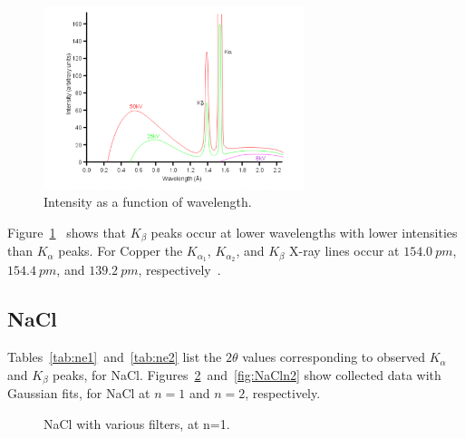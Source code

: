 \documentclass[aps,prl,twocolumn,superscriptaddress]{revtex4-1}
\begin{document}
\begin{figure}[H]
	\begin{center}
		\centerline{\includegraphics[width=3in]{figures/intensity}}
		\caption{\small{Intensity as a function of wavelength. \label{fig:intensity}}}
	\end{center}
\end{figure}

Figure~\ref{fig:intensity}~\cite{daichi} shows that $K_{\beta}$ peaks occur at lower wavelengths with lower intensities than $K_{\alpha}$ peaks.  For Copper the $K_{\alpha_{1}}$, $K_{\alpha_{2}}$, and $K_{\beta}$ X-ray lines occur at $154.0~pm$, $154.4~pm$, and $139.2~pm$, respectively~\cite{she}.


\subsection{NaCl}

Tables~\ref{tab:ne1}~and~\ref{tab:ne2} list the $2\theta$ values corresponding to observed $K_{\alpha}$ and $K_{\beta}$ peaks, for NaCl.  Figures~\ref{fig:NaCln1}~and~\ref{fig:NaCln2} show collected data with Gaussian fits, for NaCl at $n=1$ and $n=2$, respectively.

\begin{figure}[H]
	\begin{center}
		\centerline{}
		\caption{\small{NaCl with various filters, at n=1. \label{fig:NaCln1}}}
	\end{center}
\end{figure}
\end{document}
